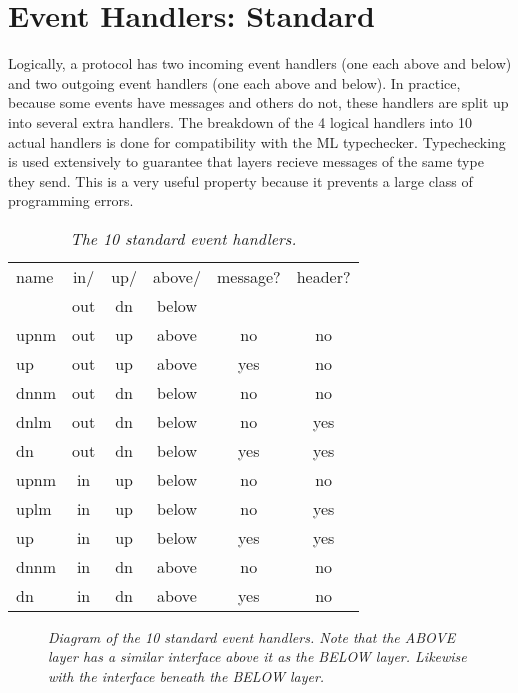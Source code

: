 \section{Event Handlers: Standard}

Logically, a protocol has two incoming event handlers (one each above and
below) and two outgoing event handlers (one each above and below).  In
practice, because some events have messages and others do not, these
handlers are split up into several extra handlers.  The breakdown of the 4
logical handlers into 10 actual handlers is done for compatibility with the
ML typechecker.  Typechecking is used extensively to guarantee that layers
recieve messages of the same type they send.  This is a very useful
property because it prevents a large class of programming errors.

\begin{table}[tb]
\begin{center}
\begin{tabular}{|l|c|c|c|c|c|} \hline
name	& in/	& up/	& above/	& message?	& header? \\
	& out	& dn	& below		&		& 	\\ \hline \hline
upnm	& out 	& up	& above		& no		& no	\\ \hline
up	& out	& up	& above		& yes		& no	\\ \hline
dnnm	& out	& dn	& below		& no		& no	\\ \hline
dnlm	& out	& dn	& below 	& no		& yes	\\ \hline
dn	& out	& dn	& below		& yes		& yes	\\ \hline \hline
upnm	& in 	& up	& below		& no		& no	\\ \hline
uplm	& in	& up	& below		& no		& yes	\\ \hline
up	& in	& up	& below		& yes		& yes	\\ \hline
dnnm	& in 	& dn 	& above		& no		& no	\\ \hline
dn	& in	& dn	& above		& yes		& no	\\ \hline
\end{tabular}
\end{center}
\caption{\em The 10 standard event handlers.}
\label{table:handlers}
\end{table}

\begin{figure}[tb]
\begin{center}
\end{center}
\caption{\em Diagram of the 10 standard event handlers.  Note that the
ABOVE layer has a similar interface above it as the BELOW layer.  Likewise
with the interface beneath the BELOW layer.}
\label{fig:handlers}
\end{figure}

